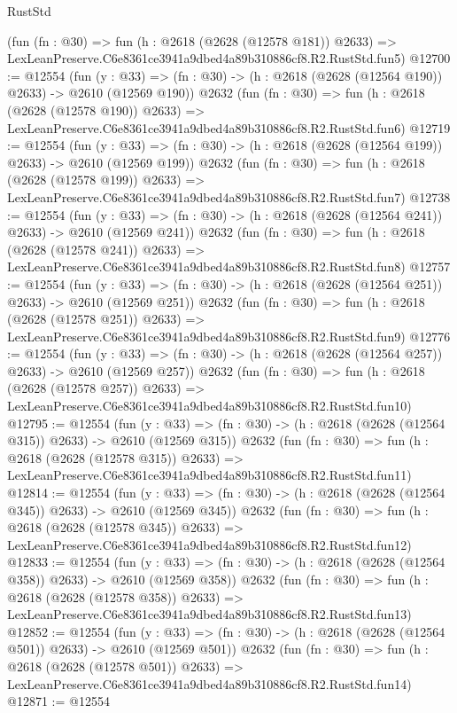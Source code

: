 \begin{lexlean}{RustStd}
\begin{coremodule}
    (fun (fn : @30) =>
    fun (h : @2618 (@2628 (@12578 @181)) @2633) =>
    LexLeanPreserve.C6e8361ce3941a9dbed4a89b310886cf8.R2.RustStd.fun5)
@12700 := @12554
    (fun (y : @33) => (fn : @30) -> (h : @2618 (@2628 (@12564 @190)) @2633) -> @2610 (@12569 @190))
    @2632
    (fun (fn : @30) =>
    fun (h : @2618 (@2628 (@12578 @190)) @2633) =>
    LexLeanPreserve.C6e8361ce3941a9dbed4a89b310886cf8.R2.RustStd.fun6)
@12719 := @12554
    (fun (y : @33) => (fn : @30) -> (h : @2618 (@2628 (@12564 @199)) @2633) -> @2610 (@12569 @199))
    @2632
    (fun (fn : @30) =>
    fun (h : @2618 (@2628 (@12578 @199)) @2633) =>
    LexLeanPreserve.C6e8361ce3941a9dbed4a89b310886cf8.R2.RustStd.fun7)
@12738 := @12554
    (fun (y : @33) => (fn : @30) -> (h : @2618 (@2628 (@12564 @241)) @2633) -> @2610 (@12569 @241))
    @2632
    (fun (fn : @30) =>
    fun (h : @2618 (@2628 (@12578 @241)) @2633) =>
    LexLeanPreserve.C6e8361ce3941a9dbed4a89b310886cf8.R2.RustStd.fun8)
@12757 := @12554
    (fun (y : @33) => (fn : @30) -> (h : @2618 (@2628 (@12564 @251)) @2633) -> @2610 (@12569 @251))
    @2632
    (fun (fn : @30) =>
    fun (h : @2618 (@2628 (@12578 @251)) @2633) =>
    LexLeanPreserve.C6e8361ce3941a9dbed4a89b310886cf8.R2.RustStd.fun9)
@12776 := @12554
    (fun (y : @33) => (fn : @30) -> (h : @2618 (@2628 (@12564 @257)) @2633) -> @2610 (@12569 @257))
    @2632
    (fun (fn : @30) =>
    fun (h : @2618 (@2628 (@12578 @257)) @2633) =>
    LexLeanPreserve.C6e8361ce3941a9dbed4a89b310886cf8.R2.RustStd.fun10)
@12795 := @12554
    (fun (y : @33) => (fn : @30) -> (h : @2618 (@2628 (@12564 @315)) @2633) -> @2610 (@12569 @315))
    @2632
    (fun (fn : @30) =>
    fun (h : @2618 (@2628 (@12578 @315)) @2633) =>
    LexLeanPreserve.C6e8361ce3941a9dbed4a89b310886cf8.R2.RustStd.fun11)
@12814 := @12554
    (fun (y : @33) => (fn : @30) -> (h : @2618 (@2628 (@12564 @345)) @2633) -> @2610 (@12569 @345))
    @2632
    (fun (fn : @30) =>
    fun (h : @2618 (@2628 (@12578 @345)) @2633) =>
    LexLeanPreserve.C6e8361ce3941a9dbed4a89b310886cf8.R2.RustStd.fun12)
@12833 := @12554
    (fun (y : @33) => (fn : @30) -> (h : @2618 (@2628 (@12564 @358)) @2633) -> @2610 (@12569 @358))
    @2632
    (fun (fn : @30) =>
    fun (h : @2618 (@2628 (@12578 @358)) @2633) =>
    LexLeanPreserve.C6e8361ce3941a9dbed4a89b310886cf8.R2.RustStd.fun13)
@12852 := @12554
    (fun (y : @33) => (fn : @30) -> (h : @2618 (@2628 (@12564 @501)) @2633) -> @2610 (@12569 @501))
    @2632
    (fun (fn : @30) =>
    fun (h : @2618 (@2628 (@12578 @501)) @2633) =>
    LexLeanPreserve.C6e8361ce3941a9dbed4a89b310886cf8.R2.RustStd.fun14)
@12871 := @12554

\end{coremodule}
\end{lexlean}

